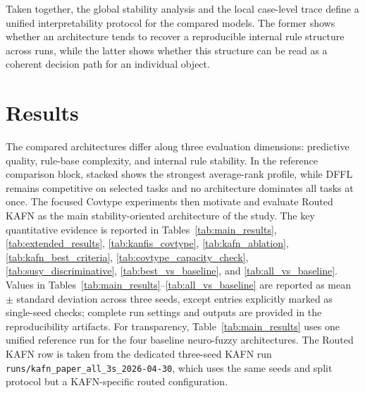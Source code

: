 \documentclass[runningheads]{llncs}
\begin{document}
Taken together, the global stability analysis and the local case-level trace define a unified interpretability protocol for the compared models. The former shows whether an architecture tends to recover a reproducible internal rule structure across runs, while the latter shows whether this structure can be read as a coherent decision path for an individual object.

\section{Results}

The compared architectures differ along three evaluation dimensions: predictive quality, rule-base complexity, and internal rule stability. In the reference comparison block, stacked shows the strongest average-rank profile, while DFFL remains competitive on selected tasks and no architecture dominates all tasks at once. The focused Covtype experiments then motivate and evaluate Routed KAFN as the main stability-oriented architecture of the study.
The key quantitative evidence is reported in Tables~\ref{tab:main_results}, \ref{tab:extended_results}, \ref{tab:kanfis_covtype}, \ref{tab:kafn_ablation}, \ref{tab:kafn_best_criteria}, \ref{tab:covtype_capacity_check}, \ref{tab:susy_discriminative}, \ref{tab:best_vs_baseline}, and \ref{tab:all_vs_baseline}.
Values in Tables~\ref{tab:main_results}--\ref{tab:all_vs_baseline} are reported as mean $\pm$ standard deviation across three seeds, except entries explicitly marked as single-seed checks; complete run settings and outputs are provided in the reproducibility artifacts.
For transparency, Table~\ref{tab:main_results} uses one unified reference run for the four baseline neuro-fuzzy architectures. The Routed KAFN row is taken from the dedicated three-seed KAFN run \texttt{runs/kafn\_paper\_all\_3s\_2026-04-30}, which uses the same seeds and split protocol but a KAFN-specific routed configuration.
\end{document}
